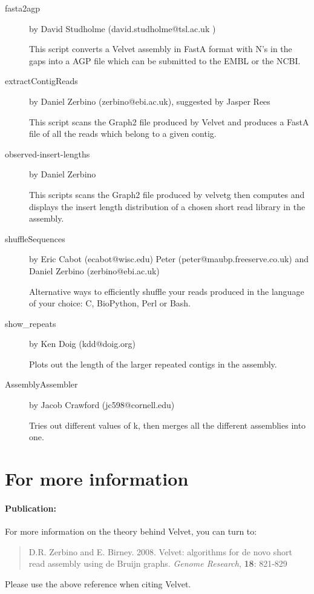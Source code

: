 \documentclass{article}
\begin{document}
\begin{description}
\item[fasta2agp] by David Studholme (david.studholme@tsl.ac.uk )

This script converts a Velvet assembly in FastA format with N's in the gaps 
into a AGP file which can be submitted to the EMBL or the NCBI.

\item[extractContigReads] by Daniel Zerbino (zerbino@ebi.ac.uk), suggested by Jasper Rees

This script scans the Graph2 file produced by Velvet and produces a FastA file
of all the reads which belong to a given contig.

\item[observed-insert-lengths] by Daniel Zerbino

This scripts scans the Graph2 file produced by velvetg then computes and displays the insert length distribution of a chosen short read library in the assembly.

\item[shuffleSequences] by Eric Cabot (ecabot@wisc.edu) Peter (peter@maubp.freeserve.co.uk) and Daniel Zerbino (zerbino@ebi.ac.uk)

Alternative ways to efficiently shuffle your reads produced in the language of your choice: C, BioPython, Perl or Bash.

\item[show\_repeats] by Ken Doig (kdd@doig.org)

Plots out the length of the larger repeated contigs in the assembly.

\item[AssemblyAssembler] by Jacob Crawford (jc598@cornell.edu)

Tries out different values of k, then merges all the different assemblies into
one.

\end{description}

\section{For more information}

\paragraph{Publication:}
 
 \label{sec:paper}
 
For more information on the theory behind Velvet, you can turn to:
\begin{quote}
D.R. Zerbino and E. Birney. 2008. Velvet: algorithms for de novo short read assembly using de Bruijn graphs. \emph{Genome Research}, \textbf{18}: 821-829
\end{quote}
Please use the above reference when citing Velvet.
\end{document}
